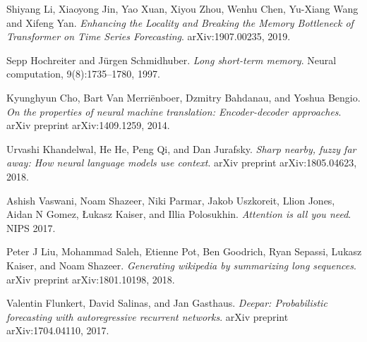 \documentclass[en]{pracamgr}
\begin{document}
\begin{thebibliography}{99}

%


%
 Shiyang Li, Xiaoyong Jin, Yao Xuan, Xiyou Zhou, Wenhu Chen, Yu-Xiang Wang and Xifeng Yan. \textit{Enhancing the Locality and Breaking the Memory
	Bottleneck of Transformer on Time Series Forecasting}. arXiv:1907.00235, 2019.

 Sepp Hochreiter and Jürgen Schmidhuber. \textit{Long short-term memory}. Neural computation, 9(8):1735–1780, 1997.

 Kyunghyun Cho, Bart Van Merriënboer, Dzmitry Bahdanau, and Yoshua Bengio. \textit{On the properties of
	neural machine translation: Encoder-decoder approaches}. arXiv preprint arXiv:1409.1259, 2014.

 Urvashi Khandelwal, He He, Peng Qi, and Dan Jurafsky. \textit{Sharp nearby, fuzzy far away: How neural language models use context}. arXiv preprint arXiv:1805.04623, 2018.

 Ashish Vaswani, Noam Shazeer, Niki Parmar, Jakob Uszkoreit, Llion Jones, Aidan N Gomez, Łukasz
Kaiser, and Illia Polosukhin. \textit{Attention is all you need}. NIPS 2017.

 Peter J Liu, Mohammad Saleh, Etienne Pot, Ben Goodrich, Ryan Sepassi, Lukasz Kaiser, and Noam
Shazeer. \textit{Generating wikipedia by summarizing long sequences}. arXiv preprint arXiv:1801.10198, 2018.

 Valentin Flunkert, David Salinas, and Jan Gasthaus. \textit{Deepar: Probabilistic forecasting with autoregressive recurrent networks}. arXiv preprint arXiv:1704.04110, 2017.


\end{thebibliography}
\end{document}
